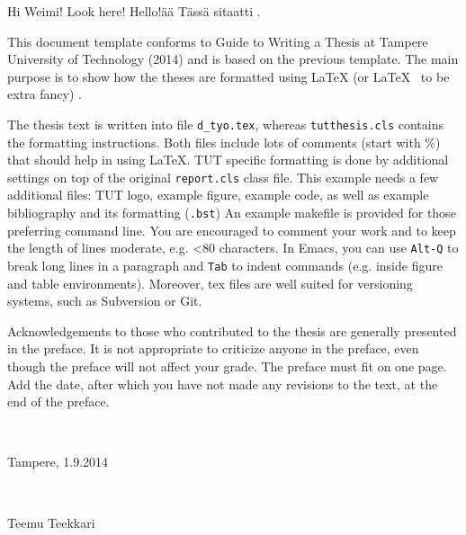\documentclass[12pt,a4paper,finnish]{tutthesis}
\begin{document}
Hi Weimi! Look here! Hello!ää Tässä sitaatti \parencite{muelaner2015hybrid}.

This document template conforms to Guide to Writing a Thesis at
Tampere University of Technology (2014) and is based on the previous
template. The main purpose is to show how the theses are formatted
using LaTeX (or \LaTeX ~ to be extra fancy) .

The thesis text is written into file \texttt{d\_tyo.tex}, whereas
\texttt{tutthesis.cls} contains the formatting instructions. Both
files include lots of comments (start with \%) that should help in
using LaTeX. TUT specific formatting is done by additional settings on
top of the original \texttt{report.cls} class file. This example needs a
few additional files: TUT logo, example figure, example code, as well
as example bibliography and its formatting (\texttt{.bst}) An example
makefile is provided for those preferring command line. You are
encouraged to comment your work and to keep the length of lines
moderate, e.g. <80 characters. In Emacs, you can use \texttt{Alt-Q} to
break long lines in a paragraph and \texttt{Tab} to indent commands
(e.g. inside figure and table environments). Moreover, tex files are
well suited for versioning systems, such as Subversion or Git.  


Acknowledgements to those who contributed to the thesis are generally
presented in the preface. It is not appropriate to criticize anyone in
the preface, even though the preface will not affect your grade. The
preface must fit on one page. Add the date, after which you have not
made any revisions to the text, at the end of the preface.

~ 

Tampere, 1.9.2014

~


Teemu Teekkari



%
%

\renewcommand\contentsname{Sisällys}         %
\setcounter{tocdepth}{3}                      %
\tableofcontents                              %
\end{document}
